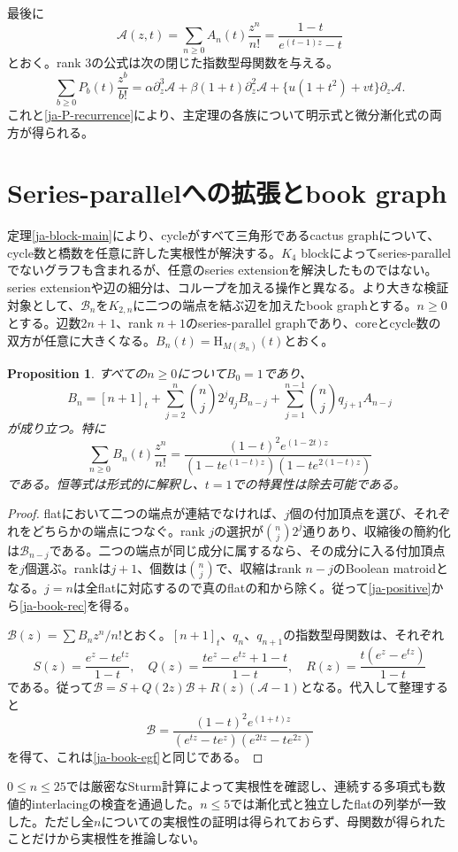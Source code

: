 \documentclass[12pt]{amsart}
\newtheorem{prop}[thm]{Proposition}
\theoremstyle{definition}
\theoremstyle{remark}
\numberwithin{equation}{section}
\newcommand{\HCh}{\mathrm{H}}
\begin{document}
最後に
\[
 \mathcal A(z,t)=\sum_{n\geq0}A_n(t)\frac{z^n}{n!}
 =\frac{1-t}{e^{(t-1)z}-t}
\]
とおく。rank 3の公式は次の閉じた指数型母関数を与える。
\[
 \sum_{b\geq0}P_b(t)\frac{z^b}{b!}
 =\alpha\partial_z^3\mathcal A+\beta(1+t)\partial_z^2\mathcal A
       +\{u(1+t^2)+vt\}\partial_z\mathcal A.
\]
これと\eqref{ja-P-recurrence}により、主定理の各族について明示式と微分漸化式の両方が得られる。

\section{Series-parallelへの拡張とbook graph}
定理\ref{ja-block-main}により、cycleがすべて三角形であるcactus graphについて、cycle数と橋数を任意に許した実根性が解決する。$K_4$ blockによってseries-parallelでないグラフも含まれるが、任意のseries extensionを解決したものではない。series extensionや辺の細分は、コループを加える操作と異なる。より大きな検証対象として、$\mathcal B_n$を$K_{2,n}$に二つの端点を結ぶ辺を加えたbook graphとする。$n\geq0$とする。辺数$2n+1$、rank $n+1$のseries-parallel graphであり、coreとcycle数の双方が任意に大きくなる。$B_n(t)=\HCh_{M(\mathcal B_n)}(t)$とおく。

\begin{samepage}
\begin{prop}\label{ja-book}
すべての$n\geq0$について$B_0=1$であり、
\begin{equation}\label{ja-book-rec}
 B_n=[n+1]_t+
 \sum_{j=2}^{n}\binom nj2^jq_jB_{n-j}
 +\sum_{j=1}^{n-1}\binom njq_{j+1}A_{n-j}
\end{equation}
が成り立つ。特に
\begin{equation}\label{ja-book-egf}
 \sum_{n\geq0}B_n(t)\frac{z^n}{n!}
 =\frac{(1-t)^2e^{(1-2t)z}}
 {(1-te^{(1-t)z})(1-te^{2(1-t)z})}
\end{equation}
である。恒等式は形式的に解釈し、$t=1$での特異性は除去可能である。
\end{prop}
\end{samepage}
\begin{proof}
flatにおいて二つの端点が連結でなければ、$j$個の付加頂点を選び、それぞれをどちらかの端点につなぐ。rank $j$の選択が$\binom nj2^j$通りあり、収縮後の簡約化は$\mathcal B_{n-j}$である。二つの端点が同じ成分に属するなら、その成分に入る付加頂点を$j$個選ぶ。rankは$j+1$、個数は$\binom nj$で、収縮はrank $n-j$のBoolean matroidとなる。$j=n$は全flatに対応するので真のflatの和から除く。従って\eqref{ja-positive}から\eqref{ja-book-rec}を得る。

$\mathcal B(z)=\sum B_nz^n/n!$とおく。$[n+1]_t$、$q_n$、$q_{n+1}$の指数型母関数は、それぞれ
\[
 S(z)=\frac{e^z-te^{tz}}{1-t},\quad
 Q(z)=\frac{te^z-e^{tz}+1-t}{1-t},\quad
 R(z)=\frac{t(e^z-e^{tz})}{1-t}
\]
である。従って$\mathcal B=S+Q(2z)\mathcal B+R(z)(\mathcal A-1)$となる。代入して整理すると
\[
 \mathcal B=\frac{(1-t)^2e^{(1+t)z}}
 {(e^{tz}-te^z)(e^{2tz}-te^{2z})}
\]
を得て、これは\eqref{ja-book-egf}と同じである。
\end{proof}
$0\leq n\leq25$では厳密なSturm計算によって実根性を確認し、連続する多項式も数値的interlacingの検査を通過した。$n\leq5$では漸化式と独立したflatの列挙が一致した。ただし全$n$についての実根性の証明は得られておらず、母関数が得られたことだけから実根性を推論しない。
\end{document}
